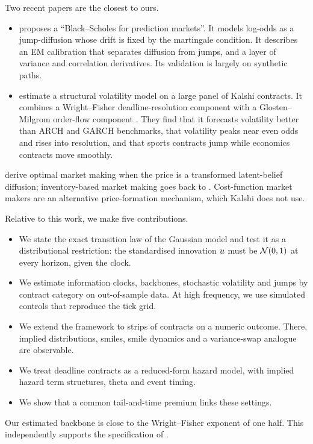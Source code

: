 Two recent papers are the closest to ours.
\begin{itemize}
  \item \citet{dalen2025} proposes a ``Black--Scholes for prediction markets''. It models log-odds as
  a jump-diffusion whose drift is fixed by the martingale condition. It describes an EM
  calibration that separates diffusion from jumps, and a layer of variance and correlation
  derivatives. Its validation is largely on synthetic paths.
  \item \citet{xi2026} estimate a structural volatility model on a large panel of Kalshi contracts.
  It combines a Wright--Fisher deadline-resolution component with a Glosten--Milgrom order-flow
  component \citep{glostenmilgrom1985}. They find that it forecasts volatility better than ARCH and
  GARCH benchmarks, that volatility peaks near even odds and rises into resolution, and that sports
  contracts jump while economics contracts move smoothly.
\end{itemize}
\citet{feilnendel2026} derive optimal market making when the price is a transformed latent-belief
diffusion; inventory-based market making goes back to \citet{avellanedastoikov2008}. Cost-function
market makers \citep{hanson2003} are an alternative price-formation mechanism, which Kalshi does
not use.

Relative to this work, we make five contributions.
\begin{itemize}
  \item We state the exact transition law of the Gaussian model and test it as a distributional
  restriction: the standardised innovation $u$ must be $\mathcal{N}(0,1)$ at every horizon, given the
  clock.
  \item We estimate information clocks, backbones, stochastic volatility and jumps by contract
  category on out-of-sample data. At high frequency, we use simulated controls that reproduce the
  tick grid.
  \item We extend the framework to strips of contracts on a numeric outcome. There, implied
  distributions, smiles, smile dynamics and a variance-swap analogue are observable.
  \item We treat deadline contracts as a reduced-form hazard model, with implied hazard term
  structures, theta and event timing.
  \item We show that a common tail-and-time premium links these settings.
\end{itemize}
Our estimated backbone is close to the Wright--Fisher exponent of one half. This independently
supports the specification of \citet{xi2026}.


